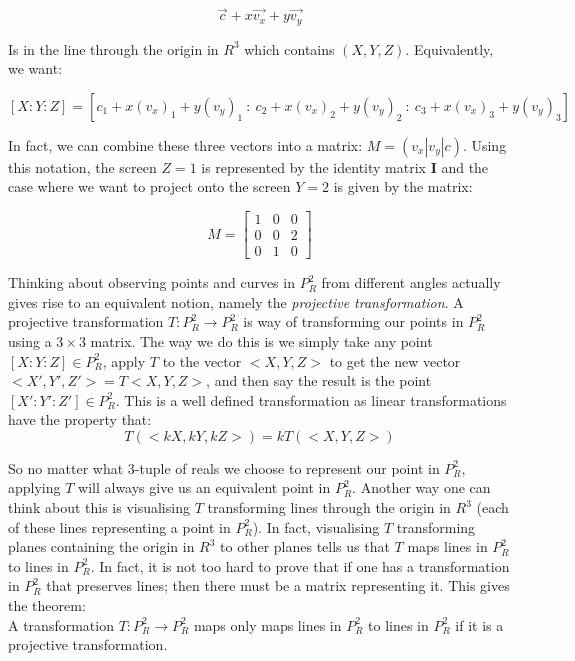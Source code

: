 \documentclass{article}
\begin{document}
\[\vec{c} + x \vec{v_x} + y \vec{v_y}\]

Is in the line through the origin in $R^3$ which contains $(X, Y, Z)$. Equivalently, we want: 

\[[X : Y : Z] = [c_1 + x (v_x)_1 + y (v_y)_1  \ : \ c_2 + x (v_x)_2 + y (v_y)_2 \ : \ c_3 + x (v_x)_3 + y (v_y)_3]\]

In fact, we can combine these three vectors into a matrix: $M = (v_x | v_y | c)$. Using this notation, the screen $Z = 1$ is represented by the identity matrix $\mathbf{I}$ and the case where we want to project onto the screen $Y = 2$ is given by the matrix:

\[
M =
\begin{bmatrix}
    1 & 0 & 0 \\
    0 & 0 & 2 \\
    0 & 1 & 0
\end{bmatrix}
\]

Thinking about observing points and curves in $P_R^2$ from different angles actually gives rise to an equivalent notion, namely the \emph{projective transformation}. A projective transformation $T: P_R^2 \rightarrow P_R^2$ is way of transforming our points in $P_R^2$ using a $3 \times 3$ matrix. The way we do this is we simply take any point $[X : Y : Z] \in P_R^2$, apply $T$ to the vector $<X , Y, Z>$ to get the new vector $<X', Y', Z'> = T<X, Y, Z>$, and then say the result is the point $[X' : Y' : Z'] \in P_R^2$. This is a well defined transformation as linear transformations have the property that:\\

\[T(<kX, kY, kZ>) = k T(<X, Y, Z>)\]

So no matter what 3-tuple of reals we choose to represent our point in $P_R^2$, applying $T$ will always give us an equivalent point in $P_R^2$. Another way one can think about this is visualising $T$ transforming lines through the origin in $R^3$ (each of these lines representing a point in $P_R^2$). In fact, visualising $T$ transforming planes containing the origin in $R^3$ to other planes tells us that $T$ maps lines in $P_R^2$ to lines in $P_R^2$. In fact, it is not too hard to prove that if one has a transformation in $P_R^2$ that preserves lines; then there must be a matrix representing it. This gives the theorem:\\

A transformation $T: P_R^2 \rightarrow P_R^2$ maps only maps lines in $P_R^2$ to lines in $P_R^2$ if it is a projective transformation.\\
\end{document}

